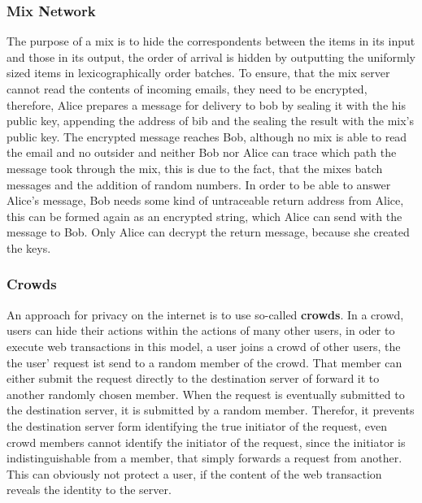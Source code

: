 \documentclass[a4paper, 10 pt, conference]{ieeeconf}
\begin{document}
\subsubsection{\textbf{Mix Network}}
\label{mix}
The purpose of a mix is to hide the correspondents between the items in its input and those in its output, the order of arrival is hidden by outputting the uniformly sized items in lexicographically order batches. 
To ensure, that the mix server cannot read the contents of incoming emails, they need to be encrypted, therefore, Alice prepares a message for delivery to bob by sealing it with the his public key, appending the address of bib and the sealing the result with the mix's public key. The encrypted message reaches Bob, although no mix is able to read the email and no outsider and neither Bob nor Alice can trace which path the message took through the mix, this is due to the fact, that the mixes batch messages and the addition of random numbers. 
In order to be able to answer Alice's message, Bob needs some kind of untraceable return address from Alice, this  can be formed again as an encrypted string, which Alice can send with the message to Bob. Only Alice can decrypt the return message, because she created the keys.
\vspace{0.5cm}
\subsubsection{\textbf{Crowds}}
\label{crowd}
An approach for privacy on the internet is to use so-called \textbf{crowds}. In a crowd, users can hide their actions within the actions of many other users, in oder to execute web transactions in this model, a user joins a crowd of other users, the the user' request ist send to a random member of the crowd. That member can either submit the request directly to the destination server of forward it to another randomly chosen member. When the request is eventually submitted to the destination server, it is submitted by a random member. Therefor, it prevents the destination server form identifying the true initiator of the request, even crowd members cannot identify the initiator of the request, since the initiator is indistinguishable from a member, that simply forwards a request from another. This can obviously not protect a user, if the content of the web transaction reveals the identity to the server. \\


\vspace{0.5cm}
\end{document}
